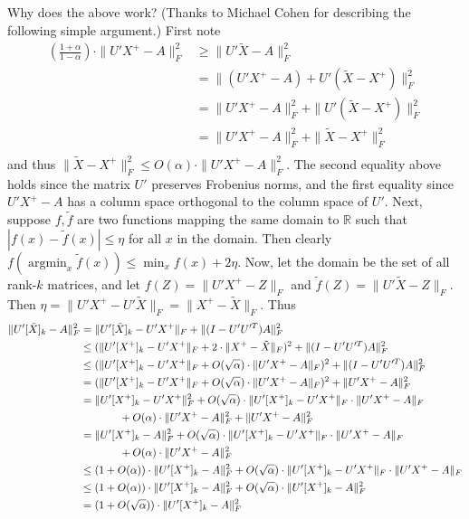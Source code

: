 \documentclass[11pt]{article}
\newcommand{\R}{\mathbb{R}}
\begin{document}
Why does the above work? (Thanks to Michael Cohen for describing the following simple argument.) First note
\begin{align*}
\left(\frac{1+\alpha}{1-\alpha}\right)\cdot \|U'X^+ - A\|_F^2 &\ge \|U'\tilde{X} - A\|_F^2\\
{} &= \|(U'X^+ - A) + U'(\tilde{X} - X^+)\|_F^2\\
{}&=\|U'X^+ - A\|_F^2 + \|U'(\tilde{X} - X^+)\|_F^2\\
{}&=\|U'X^+ - A\|_F^2 + \|\tilde{X} - X^+\|_F^2\\
\end{align*}
and thus $\|\tilde{X} - X^+\|_F^2 \le O(\alpha)\cdot\|U'X^+ - A\|_F^2$. The second equality above holds since the matrix $U'$ preserves Frobenius norms, and the first equality since $U'X^+ - A$ has a column space orthogonal to the column space of $U'$. Next, suppose $f, \tilde{f}$ are two functions mapping the same domain to $\R$ such that $|f(x) - \tilde{f}(x)| \le \eta$ for all $x$ in the domain. Then clearly $f(\mathop{argmin}_x \tilde{f}(x)) \le \min_x f(x) + 2\eta$. Now, let the domain be the set of all rank-$k$ matrices, and let $f(Z) = \|U'X^+ - Z\|_F$ and $\tilde{f}(Z) = \|U'\tilde{X} - Z\|_F$. Then $\eta = \|U'X^+ - U'\tilde{X}\|_F = \|X^+ - \tilde{X}\|_F$. Thus
\begin{align}
\nonumber \|U' [\tilde{X}]_k - A\|_F^2 &= \|U'[\tilde{X}]_k - U'X^+\|_F + \|(I - U'U'^T)A\|_F^2\\
\nonumber {}&\le (\|U'[X^+]_k - U'X^+\|_F + 2\cdot \|X^+ - \tilde{X}\|_F)^2 + \|(I - U'U'^T)A\|_F^2\\
\nonumber    {}&\le (\|U'[X^+]_k - U'X^+\|_F + O(\sqrt{\alpha})\cdot \|U'X^+ - A\|_F)^2 + \|(I - U'U'^T)A\|_F^2\\
\nonumber {}&= (\|U'[X^+]_k - U'X^+\|_F + O(\sqrt{\alpha})\cdot \|U'X^+ - A\|_F)^2 + \|U'X^+ - A\|_F^2\\
\nonumber {}&= \|U'[X^+]_k - U'X^+\|_F^2 + O(\sqrt{\alpha})\cdot \|U'[X^+]_k - U'X^+\|_F\cdot \|U'X^+ - A\|_F \\
\nonumber {}&\hspace{.5in}+   O(\alpha)\cdot \|U'X^+ - A\|_F^2 + \|U'X^+ - A\|_F^2\\
\nonumber {}&= \|U'[X^+]_k - A\|_F^2 + O(\sqrt{\alpha})\cdot \|U'[X^+]_k - U'X^+\|_F\cdot \|U'X^+ - A\|_F \\
{}&\hspace{.5in}+   O(\alpha)\cdot \|U'X^+ - A\|_F^2\label{eqn:pythagoras}\\
{}&\le (1+O(\alpha))\cdot\|U'[X^+]_k - A\|_F^2 + O(\sqrt{\alpha})\cdot \|U'[X^+]_k - U'X^+\|_F\cdot \|U'X^+ - A\|_F\label{eqn:better}\\
{}&\le (1+O(\alpha))\cdot\|U'[X^+]_k - A\|_F^2 + O(\sqrt{\alpha})\cdot \|U'[X^+]_k - A\|_F^2\label{eqn:better2}\\
\nonumber {}&= (1+O(\sqrt{\alpha}))\cdot\|U'[X^+]_k - A\|_F^2 
\end{align}
\end{document}
